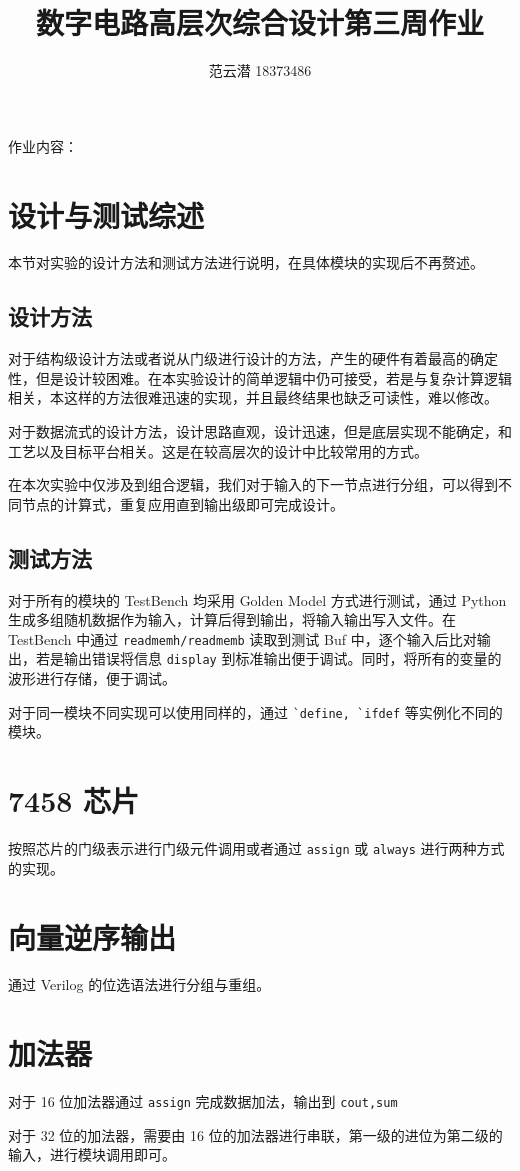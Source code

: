 \documentclass[lang=cn,11pt,a4paper,cite=authoryear]{elegantpaper}
\title{数字电路高层次综合设计\quad 第三周作业}
\author{范云潜 18373486}
\institute{微电子学院 184111 班}
\date{\zhtoday}
\begin{document}
\maketitle

作业内容：


\section{设计与测试综述}

本节对实验的设计方法和测试方法进行说明，在具体模块的实现后不再赘述。

\subsection{设计方法}

对于结构级设计方法或者说从门级进行设计的方法，产生的硬件有着最高的确定性，但是设计较困难。在本实验设计的简单逻辑中仍可接受，若是与复杂计算逻辑相关，本这样的方法很难迅速的实现，并且最终结果也缺乏可读性，难以修改。

对于数据流式的设计方法，设计思路直观，设计迅速，但是底层实现不能确定，和工艺以及目标平台相关。这是在较高层次的设计中比较常用的方式。

在本次实验中仅涉及到组合逻辑，我们对于输入的下一节点进行分组，可以得到不同节点的计算式，重复应用直到输出级即可完成设计。

\subsection{测试方法}

对于所有的模块的 TestBench 均采用 Golden Model 方式进行测试，通过 Python 生成多组随机数据作为输入，计算后得到输出，将输入输出写入文件。在 TestBench 中通过 \lstinline{readmemh/readmemb} 读取到测试 Buf 中，逐个输入后比对输出，若是输出错误将信息 \lstinline{display} 到标准输出便于调试。同时，将所有的变量的波形进行存储，便于调试。

对于同一模块不同实现可以使用同样的，通过 \lstinline{`define, `ifdef} 等实例化不同的模块。

\section{7458 芯片}

按照芯片的门级表示进行门级元件调用或者通过 \lstinline{assign} 或 \lstinline{always} 进行两种方式的实现。

\section{向量逆序输出}

通过 Verilog 的位选语法进行分组与重组。

\section{加法器}

对于 16 位加法器通过 \lstinline{assign} 完成数据加法，输出到 \lstinline{cout,sum}

对于 32 位的加法器，需要由 16 位的加法器进行串联，第一级的进位为第二级的输入，进行模块调用即可。

\end{document}
